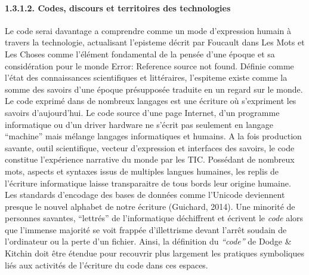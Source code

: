 \paragraph[1.3.1.2. Codes, discours et territoires des technologies]{1.3.1.2. Codes, discours et territoires des
technologies}
\hypertarget{RefHeading211699228146}{}{\color{black}
Le code serai davantage a comprendre comme un mode d'expression humain \`a travers la technologie, actualisant
l'episteme d\'ecrit par Foucault dans Les Mots et Les Choses comme l'\'el\'ement fondamental de la pens\'ee d'une
\'epoque et sa consid\'eration pour le monde Error: Reference source not found. D\'efinie comme l'\'etat des
connaissances scientifiques et litt\'eraires, l{}'espiteme existe comme la somme des savoirs d'une \'epoque
pr\'esuppos\'ee traduite en un regard sur le monde. Le code exprim\'e dans de nombreux langages est une \'ecriture o\`u
s{}'expriment les savoirs d'aujourd'hui. Le code source d'une page Internet, d'un programme informatique ou d'un driver
hardware ne s'\'ecrit pas seulement en langage ``machine'' mais m\'elange langages informatiques et humains. A la fois
production savante, outil scientifique, vecteur d'expression et interfaces des savoirs, le code constitue
l'exp\'erience narrative du monde par les TIC. Poss\'edant de nombreux mots, aspects et syntaxes issus de multiples
langues humaines, les replis de l'\'ecriture informatique laisse transparaitre de tous bords leur origine humaine. Les
standards d'encodage des bases de donn\'ees comme l'Unicode deviennent presque le nouvel alphabet de notre \'ecriture
(Guichard, 2014). Une minorit\'e de personnes savantes, ``lettr\'es'' de l'informatique d\'echiffrent et \'ecrivent le
\textit{code }alors que l'immense majorit\'e se voit frapp\'ee d'illettrisme devant l'arr\^et soudain de l'ordinateur
ou la perte d'un fichier. Ainsi, la d\'efinition du \textit{{}``code'' }de Dodge \& Kitchin doit \^etre \'etendue pour
recouvrir plus largement les pratiques symboliques li\'es aux activit\'es de l'\'ecriture du code dans ces espaces.}


\bigskip

